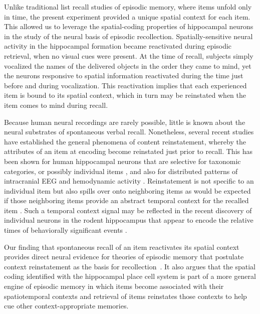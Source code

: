 
Unlike traditional list recall studies of episodic memory, where items unfold only in time, the present experiment provided a unique spatial context for each item.  This allowed us to leverage the  spatial-coding properties of hippocampal neurons in the study of the neural basis of episodic recollection.  Spatially-sensitive neural activity in the hippocampal formation became reactivated during episodic retrieval, when no visual cues were present.  At the time of recall, subjects simply vocalized the names of the delivered objects in the order they came to mind, yet the neurons responsive to spatial  information reactivated during the time just before and during vocalization.  This reactivation implies  that  each experienced item is bound to its spatial context, which in turn may be reinstated when the item comes to mind during recall.  

Because human neural recordings are rarely possible, little is known about the neural substrates of spontaneous verbal recall.  Nonetheless, several recent studies have established the general phenomena of content reinstatement, whereby the attributes of an item at encoding become reinstated just prior to recall.  This has been shown for human hippocampal neurons that are selective for taxonomic categories, or possibly individual items \cite{GelbEtal08}, and also for distributed patterns of intracranial EEG and hemodynamic activity \cite{MannEtal12,PolyEtal05}.  Reinstatement is not specific to an individual item but also spills over onto neighboring items as would be expected if those neighboring items provide an abstract temporal context for the recalled item \cite{MannEtal11,HowaEtal12}.  Such a temporal context signal may be reflected in the recent discovery of individual neurons in the rodent hippocampus that appear to encode the relative times of behaviorally significant events \cite{PastEtal08,MacDEtal11}.

Our finding that spontaneous recall of an item reactivates its spatial context provides direct neural evidence for theories of episodic memory that postulate context reinstatement as the basis for recollection~\cite{PolyKaha08,PolyEtal09}.  It also argues that the spatial coding identified with  the hippocampal place cell system is part of a more general engine of episodic memory in which items become associated with their spatiotemporal contexts and retrieval of items reinstates those contexts to help cue other context-appropriate memories.


